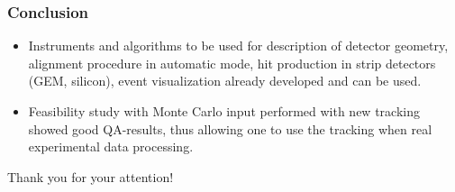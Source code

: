 \documentclass[dvipsnames, aspectratio=43] {beamer}
\begin{document}
\begin{frame}
\end{frame}


\begin{frame}
  \bf
  \frametitle{\bf \centering Conclusion}
  \begin{block}{}
    \begin{itemize}
    \item Instruments and algorithms to be used for description of detector geometry,
      alignment procedure in automatic mode, hit production in strip detectors (GEM, silicon), event visualization
      already developed and can be used.
    \item Feasibility study with Monte Carlo input performed with new tracking showed good QA-results,
      thus allowing one to use the tracking when real experimental data processing.
    \end{itemize}
  \end{block}
  \begin{block}{}
    \centering Thank you for your attention!
  \end{block}
\end{frame}
\end{document}
